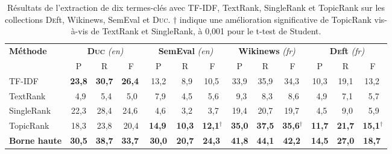         \begin{table}
          \centering
          \begin{tabular}{l|c@{~~}c@{~~}c@{~}|c@{~~}c@{~~}c@{~}|c@{~~}c@{~~}c@{~}|c@{~~}c@{~~}c@{~}}
            \toprule
            \multirow{2}{*}[-2pt]{\textbf{Méthode}} & \multicolumn{3}{c|}{\textbf{\textsc{Duc}} \textit{(en)}} & \multicolumn{3}{c|}{\textbf{SemEval} \textit{(en)}} & \multicolumn{3}{c|}{\textbf{Wikinews} \textit{(fr)}} & \multicolumn{3}{c}{\textbf{\textsc{De}ft} \textit{(fr)}}\\
            \cline{2-4}\cline{5-7}\cline{8-10}\cline{11-13}
            & P & R & F & P & R & F & P & R & F & P & R & F\\
            \hline
            TF-IDF & \textbf{23,8} & \textbf{30,7} & \textbf{26,4}$^{~}$ & 13,2 & $~~$8,9 & 10,5$^{~}$ & 33,9 & 35,9 & 34,3$^{~}$ & 10,3 & 19,1 & 13,2$^{~}$\\
            TextRank & $~~$4,9 & $~~$5,4 & $~~$5,0$^{~}$ & $~~$7,9 & $~~$4,5 & $~~$5,6$^{~}$ & $~~$9,3 & $~~$8,3 & $~~$8,6$^{~}$ & $~~$4,9 & $~~$7,1 & $~~$5,7$^{~}$\\
            SingleRank & 22,3 & 28,4 & 24,6$^{~}$ & $~~$4,6 & $~~$3,2 & $~~$3,7$^{~}$ & 19,4 & 20,7 & 19,7$^{~}$ & $~~$4,5 & $~~$9,0 & $~~$5,9$^{~}$\\
            TopicRank & 18,3 & 23,8 & 20,4 & \textbf{14,9}$^{~}$ & \textbf{10,3} & \textbf{12,1}$^\dagger$ & \textbf{35,0} & \textbf{37,5} & \textbf{35,6}$^\dagger$ & \textbf{11,7} & \textbf{21,7} & \textbf{15,1}$^\dagger$\\
            \hline
            \textbf{Borne haute} & \textbf{30,5} & \textbf{38,7} & \textbf{33,7}$^{~}$ & \textbf{30,0} & \textbf{20,7} & \textbf{24,3}$^{~}$ & \textbf{41,8} & \textbf{44,1} & \textbf{42,2}$^{~}$ & \textbf{14,5} & \textbf{27,0} & \textbf{18,7}$^{~}$\\
            \bottomrule
          \end{tabular}
          \caption[Résultats de l'extraction de dix termes-clés avec TF-IDF,
                   TextRank, SingleRank et TopicRank sur les collections
                   \textsc{De}ft, Wikinews, SemEval et \textsc{Duc}]{
            Résultats de l'extraction de dix termes-clés avec TF-IDF, TextRank,
            SingleRank et TopicRank sur les collections \textsc{De}ft, Wikinews,
            SemEval et \textsc{Duc}. $\dagger$ indique une amélioration
            significative de TopicRank vis-à-vis de TextRank et SingleRank, à
            0,001 pour le t-test de Student.
            \label{tab:resultats_globaux}
          }
        \end{table}

